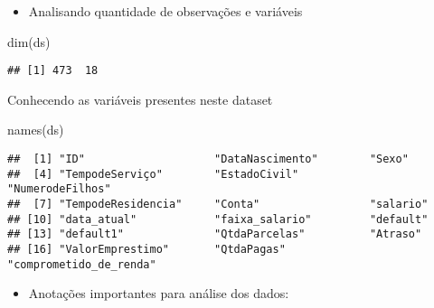 \documentclass[
]{article}
\newenvironment{Shaded}{\begin{snugshade}}{\end{snugshade}}
\newcommand{\FunctionTok}[1]{\textcolor[rgb]{0.00,0.00,0.00}{#1}}
\newcommand{\NormalTok}[1]{#1}
\providecommand{\tightlist}{%
  \setlength{\itemsep}{0pt}\setlength{\parskip}{0pt}}
\begin{document}
\begin{itemize}
\tightlist
\item
  Analisando quantidade de observações e variáveis
\end{itemize}

\begin{Shaded}
\begin{Highlighting}[]
\FunctionTok{dim}\NormalTok{(ds)}
\end{Highlighting}
\end{Shaded}

\begin{verbatim}
## [1] 473  18
\end{verbatim}

Conhecendo as variáveis presentes neste dataset

\begin{Shaded}
\begin{Highlighting}[]
\FunctionTok{names}\NormalTok{(ds)}
\end{Highlighting}
\end{Shaded}

\begin{verbatim}
##  [1] "ID"                    "DataNascimento"        "Sexo"                 
##  [4] "TempodeServiço"        "EstadoCivil"           "NumerodeFilhos"       
##  [7] "TempodeResidencia"     "Conta"                 "salario"              
## [10] "data_atual"            "faixa_salario"         "default"              
## [13] "default1"              "QtdaParcelas"          "Atraso"               
## [16] "ValorEmprestimo"       "QtdaPagas"             "comprometido_de_renda"
\end{verbatim}

\begin{itemize}
\tightlist
\item
  Anotações importantes para análise dos dados:
\end{itemize}
\end{document}
